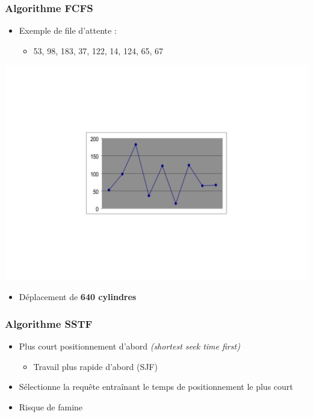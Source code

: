 \begin{frame}
\frametitle{Algorithme FCFS}
\begin{itemize}
\item Exemple de file d'attente :
\begin{itemize}
\item 53, 98, 183, 37, 122, 14, 124, 65, 67
\end{itemize}
\end{itemize}
\begin{flushright}
\includegraphics[width=.6\textwidth]{../illustration/prog_disque_fcfs.pdf}
\end{flushright}
\begin{itemize}
\item Déplacement de \textbf{640 cylindres}
\end{itemize}
\end{frame}

\begin{frame}
\frametitle{Algorithme SSTF}
\begin{itemize}
\item Plus court positionnement d'abord \textit{(shortest seek time first)}
\begin{itemize}
\item Travail plus rapide d'abord (SJF)
\end{itemize}
\item Sélectionne la requête entraînant le temps de positionnement le plus court

\item Risque de famine
\end{itemize}
\end{frame}


